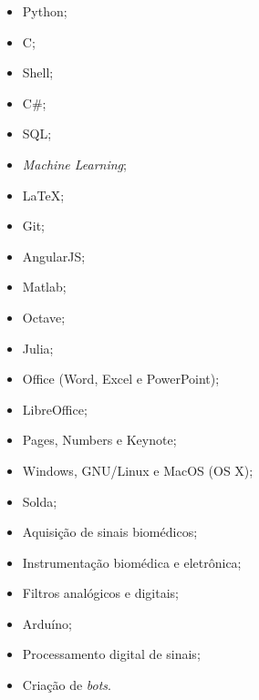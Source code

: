 \documentclass[11pt]{article}
\begin{document}
\begin{multicols}{3} %
\begin{itemize}
    \item Python;
    \item C;
    \item Shell;
    \item C\#;
    \item SQL;
    \item \textit{Machine Learning};
    \item \LaTeX ;
    \item Git;
    \item AngularJS;
    \item Matlab;
    \item Octave;
    \item Julia;
    \item Office (Word, Excel e PowerPoint);
    \item LibreOffice;
    \item Pages, Numbers e Keynote;
    \item Windows, GNU/Linux e MacOS (OS X);
    \item Solda;
    \item Aquisição de sinais biomédicos;
    \item Instrumentação biomédica e eletrônica;
    \item Filtros analógicos e digitais;
    \item Arduíno;
    \item Processamento digital de sinais;
    \item Criação de \textit{bots}.
\end{itemize}
\end{multicols}
\end{document}
